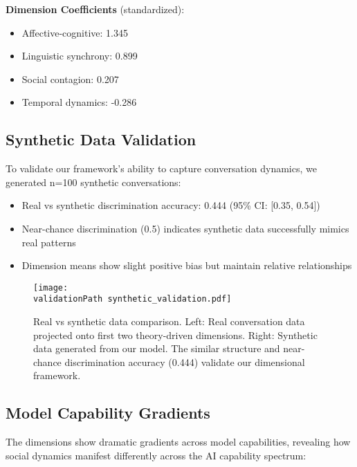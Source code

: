 \documentclass[11pt,letterpaper]{article}
\newcommand{\socialContagionCoef}{0.207}
\newcommand{\affectiveCognitiveCoef}{1.345}
\newcommand{\linguisticSynchronyCoef}{0.899}
\newcommand{\temporalDynamicsCoef}{-0.286}
\newcommand{\syntheticDiscriminationAccuracy}{0.444}
\newcommand{\syntheticDiscriminationCI}{[0.35, 0.54]}
\newcommand{\validationPath}{../analysis/analysis_outputs_n110/validation/}
\begin{document}
\textbf{Dimension Coefficients} (standardized):
\begin{itemize}
    \item Affective-cognitive: \affectiveCognitiveCoef{}
    \item Linguistic synchrony: \linguisticSynchronyCoef{}
    \item Social contagion: \socialContagionCoef{}
    \item Temporal dynamics: \temporalDynamicsCoef{}
\end{itemize}

\subsection{Synthetic Data Validation}

To validate our framework's ability to capture conversation dynamics, we generated n=100 synthetic conversations:

\begin{itemize}
    \item Real vs synthetic discrimination accuracy: \syntheticDiscriminationAccuracy{} (95\% CI: \syntheticDiscriminationCI{})
    \item Near-chance discrimination (0.5) indicates synthetic data successfully mimics real patterns
    \item Dimension means show slight positive bias but maintain relative relationships
\end{itemize}

\begin{figure}[htbp]
\centering
\texttt{[image: \\validationPath synthetic\_validation.pdf]}
\caption{Real vs synthetic data comparison. Left: Real conversation data projected onto first two theory-driven dimensions. Right: Synthetic data generated from our model. The similar structure and near-chance discrimination accuracy (\syntheticDiscriminationAccuracy{}) validate our dimensional framework.}
\label{fig:synthetic_validation}
\end{figure}

\subsection{Model Capability Gradients}

The dimensions show dramatic gradients across model capabilities, revealing how social dynamics manifest differently across the AI capability spectrum:
\end{document}
